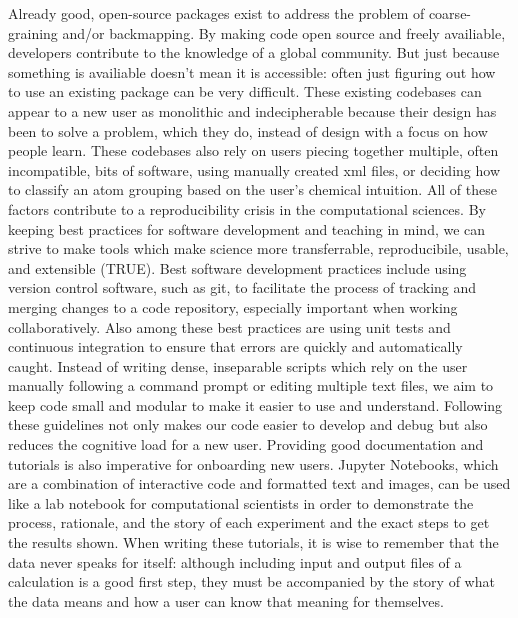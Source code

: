 Already good, open-source packages exist to address the problem of coarse-graining and/or backmapping\cite{Marrink2007,Ruhle2009,Maerzke2011,MorphCT,Wassenaar2014b}. %
By making code open source and freely availiable, developers contribute to the knowledge of a global community. 
But just because something is availiable doesn't mean it is accessible: often just figuring out how to use an existing package can be very difficult\cite{Cummings2019}.
These existing codebases can appear to a new user as monolithic and indecipherable because their design has been to solve a problem, which they do, instead of design with a focus on how people learn.
These codebases also rely on users piecing together multiple, often incompatible, bits of software, using manually created xml files, or deciding how to classify an atom grouping based on the user's chemical intuition.
All of these factors contribute to a reproducibility crisis in the computational sciences\cite{Baker2016}.
By keeping best practices for software development and teaching in mind, we can strive to make tools which make science more transferrable, reproducibile, usable, and extensible (TRUE)\cite{Thompson2020}.
Best software development practices include using version control software, such as git, to facilitate the process of tracking and merging changes to a code repository, especially important when working collaboratively.
Also among these best practices are using unit tests and continuous integration to ensure that errors are quickly and automatically caught\cite{Wilson2014}.
Instead of writing dense, inseparable scripts which rely on the user manually following a command prompt or editing multiple text files, we aim to keep code small and modular to make it easier to use and understand\cite{Adorf2018a}.
Following these guidelines not only makes our code easier to develop and debug but also reduces the cognitive load for a new user\cite{Jankowski2019}.
Providing good documentation and tutorials is also imperative for onboarding new users.
Jupyter Notebooks, which are a combination of interactive code and formatted text and images, can be used like a lab notebook for computational scientists in order to demonstrate the process, rationale, and the story of each experiment and the exact steps to get the results shown\cite{jupyter, Rule2019a}.
When writing these tutorials, it is wise to remember that the data never speaks for itself: although including input and output files of a calculation is a good first step, they must be accompanied by the story of what the data means and how a user can know that meaning for themselves\cite{SWC, Wilson2016}.
